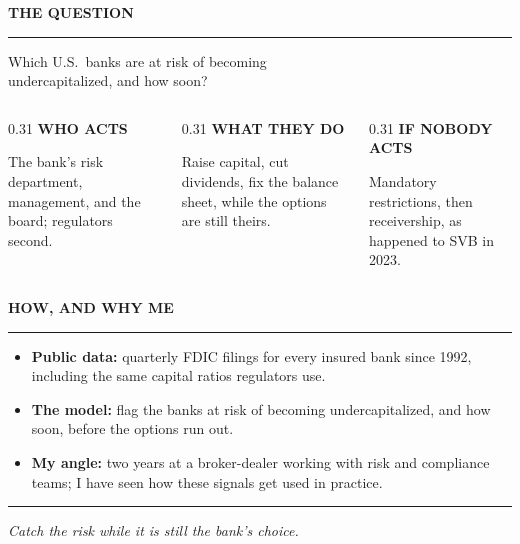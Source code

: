 \documentclass[aspectratio=169,11pt,t]{beamer}
\newcommand{\slidelabel}[1]{%
  {\sffamily\bfseries\fontsize{10}{13}\selectfont\color{navy}\MakeUppercase{#1}}\par
  \vspace{-6pt}\textcolor{hairline}{\rule{\textwidth}{0.5pt}}\par\vspace{8pt}}
\begin{document}
\begin{frame}
  \slidelabel{The question}
  \vspace{4pt}
  {\fontsize{16}{22}\selectfont Which U.S.\ banks are at risk of becoming\\undercapitalized, and how soon?}\par
  \vspace{30pt}
  \begin{columns}[t]
    \begin{column}{0.31\textwidth}
      {\sffamily\bfseries\fontsize{9}{12}\selectfont\color{navy}WHO ACTS}\par\vspace{4pt}
      {\fontsize{10.5}{14}\selectfont The bank's risk department, management, and the board; regulators second.}
    \end{column}
    \begin{column}{0.31\textwidth}
      {\sffamily\bfseries\fontsize{9}{12}\selectfont\color{navy}WHAT THEY DO}\par\vspace{4pt}
      {\fontsize{10.5}{14}\selectfont Raise capital, cut dividends, fix the balance sheet, while the options are still theirs.}
    \end{column}
    \begin{column}{0.31\textwidth}
      {\sffamily\bfseries\fontsize{9}{12}\selectfont\color{navy}IF NOBODY ACTS}\par\vspace{4pt}
      {\fontsize{10.5}{14}\selectfont Mandatory restrictions, then receivership, as happened to SVB in 2023.}
    \end{column}
  \end{columns}
\end{frame}

\begin{frame}
  \slidelabel{How, and why me}
  \vspace{2pt}
  \begin{itemize}\itemsep=9pt
    \item {\fontsize{11.5}{15}\selectfont \textbf{Public data:} quarterly FDIC filings for every insured bank since 1992, including the same capital ratios regulators use.}
    \item {\fontsize{11.5}{15}\selectfont \textbf{The model:} flag the banks at risk of becoming undercapitalized, and how soon, before the options run out.}
    \item {\fontsize{11.5}{15}\selectfont \textbf{My angle:} two years at a broker-dealer working with risk and compliance teams; I have seen how these signals get used in practice.}
  \end{itemize}
  \vspace{16pt}
  \textcolor{hairline}{\rule{\textwidth}{0.5pt}}\par\vspace{8pt}
  {\fontsize{12}{16}\selectfont\itshape\color{midgray}Catch the risk while it is still the bank's choice.}
\end{frame}
\end{document}
